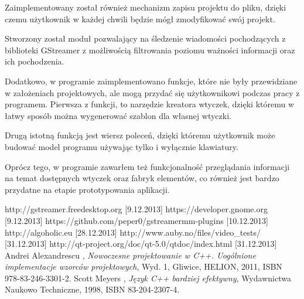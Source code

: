\documentclass[12pt]{article}
\begin{document}
Zaimplementowany został również mechanizm zapisu projektu do pliku, dzięki czemu użytkownik w każdej chwili będzie mógł zmodyfikować swój projekt. 

Stworzony został moduł pozwalający na śledzenie wiadomości pochodzących z biblioteki GStreamer z możliwością filtrowania poziomu ważności informacji oraz ich pochodzenia.

Dodatkowo, w programie zaimplementowano funkcje, które nie były przewidziane w założeniach projektowych, ale mogą przydać się użytkownikowi podczas pracy z programem. Pierwsza z funkcji, to narzędzie kreatora wtyczek, dzięki któremu w łatwy sposób można wygenerować szablon dla własnej wtyczki. 

Drugą istotną funkcją jest wiersz poleceń, dzięki któremu użytkownik może budować model programu używając tylko i wyłącznie klawiatury.

Oprócz tego, w programie zawarłem też funkcjonalność przeglądania informacji na temat dostępnych wtyczek oraz fabryk elementów, co również jest bardzo przydatne na etapie prototypowania aplikacji.
\cleardoublepage
\begin{thebibliography}{9}

  http://gstreamer.freedesktop.org [9.12.2013]
  https://developer.gnome.org [9.12.2013]
  https://github.com/peper0/gstreamermm-plugins [10.12.2013]
  http://algoholic.eu [28.12.2013]
  http://www.auby.no/files/video\_tests/ [31.12.2013]
  http://qt-project.org/doc/qt-5.0/qtdoc/index.html [31.12.2013]
  Andrei Alexandrescu , \textit{Nowoczesne projektowanie w C++. Uogólnione implementacje wzorców projektowych}, Wyd. 1, Gliwice, HELION, 2011, ISBN 978-83-246-3301-2.
  Scott Meyers , \textit{Język C++ bardziej efektywny}, Wydawnictwa Naukowo Techniczne, 1998, ISBN 83-204-2307-4.
\end{thebibliography}
\end{document}

